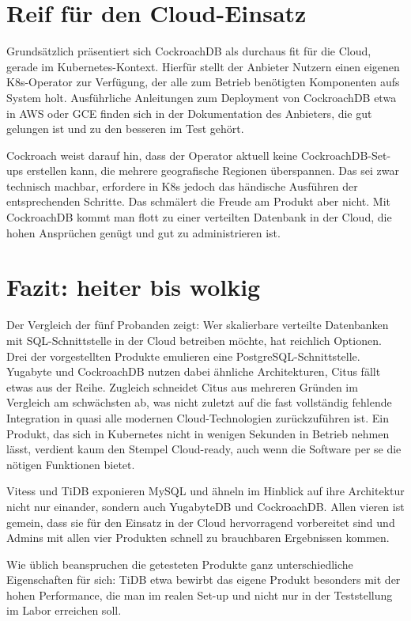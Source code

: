 \section{Reif für den Cloud-Einsatz}

Grundsätzlich präsentiert sich CockroachDB als durchaus fit für die Cloud, gerade im Kubernetes-Kontext. Hierfür stellt der Anbieter Nutzern einen eigenen K8s-Operator zur Verfügung, der alle zum Betrieb benötigten Komponenten aufs System holt. Ausführliche Anleitungen zum Deployment von CockroachDB etwa in AWS oder GCE finden sich in der Dokumentation des Anbieters, die gut gelungen ist und zu den besseren im Test gehört.

Cockroach weist darauf hin, dass der Operator aktuell keine CockroachDB-Set-ups erstellen kann, die mehrere geografische Regionen überspannen. Das sei zwar technisch machbar, erfordere in K8s jedoch das händische Ausführen der entsprechenden Schritte. Das schmälert die Freude am Produkt aber nicht. Mit CockroachDB kommt man flott zu einer verteilten Datenbank in der Cloud, die hohen Ansprüchen genügt und gut zu administrieren ist.

\section{Fazit: heiter bis wolkig}


Der Vergleich der fünf Probanden zeigt: Wer skalierbare verteilte Datenbanken mit SQL-Schnittstelle in der Cloud betreiben möchte, hat reichlich Optionen. Drei der vorgestellten Produkte emulieren eine PostgreSQL-Schnittstelle. Yugabyte und CockroachDB nutzen dabei ähnliche Architekturen, Citus fällt etwas aus der Reihe. Zugleich schneidet Citus aus mehreren Gründen im Vergleich am schwächsten ab, was nicht zuletzt auf die fast vollständig fehlende Integration in quasi alle modernen Cloud-Technologien zurückzuführen ist. Ein Produkt, das sich in Kubernetes nicht in wenigen Sekunden in Betrieb nehmen lässt, verdient kaum den Stempel Cloud-ready, auch wenn die Software per se die nötigen Funktionen bietet.

Vitess und TiDB exponieren MySQL und ähneln im Hinblick auf ihre Architektur nicht nur einander, sondern auch YugabyteDB und CockroachDB. Allen vieren ist gemein, dass sie für den Einsatz in der Cloud hervorragend vorbereitet sind und Admins mit allen vier Produkten schnell zu brauchbaren Ergebnissen kommen.

Wie üblich beanspruchen die getesteten Produkte ganz unterschiedliche Eigenschaften für sich: TiDB etwa bewirbt das eigene Produkt besonders mit der hohen Performance, die man im realen Set-up und nicht nur in der Teststellung im Labor erreichen soll.

